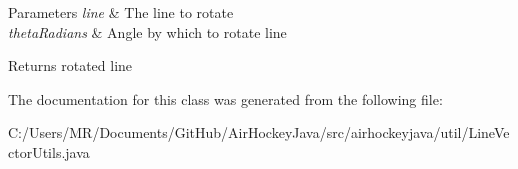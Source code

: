 \begin{DoxyParams}{Parameters}
{\em line} & The line to rotate \\
\hline
{\em theta\+Radians} & Angle by which to rotate line \\
\hline
\end{DoxyParams}
\begin{DoxyReturn}{Returns}
rotated line 
\end{DoxyReturn}


The documentation for this class was generated from the following file\+:\begin{DoxyCompactItemize}
\item 
C\+:/\+Users/\+M\+R/\+Documents/\+Git\+Hub/\+Air\+Hockey\+Java/src/airhockeyjava/util/Line\+Vector\+Utils.\+java\end{DoxyCompactItemize}
